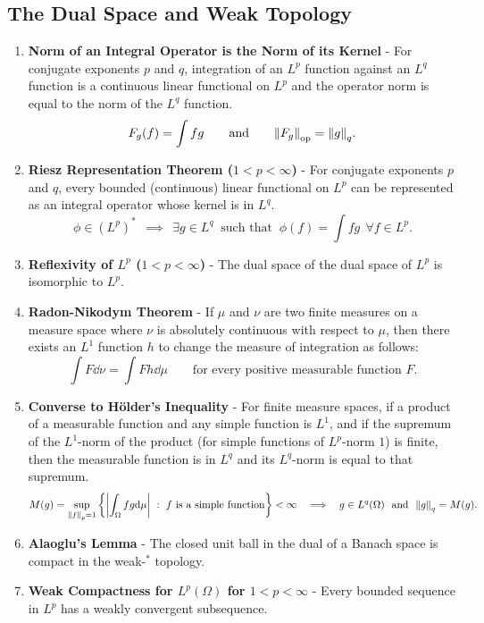 \documentclass{article}
\begin{document}
    \subsection{The Dual Space and Weak Topology}
    \begin{enumerate}
        \item
            \textbf{Norm of an Integral Operator is the Norm of its Kernel} - For conjugate exponents $p$ and $q$, integration of an $L^p$ function against an $L^q$ function is a continuous linear functional on $L^p$ and the operator norm is equal to the norm of the $L^q$ function.  $$F_g(f) = \int fg \qquad \text{and} \qquad \norm{F_g}_\text{op} = \norm{g}_q.$$
        \item
            \textbf{Riesz Representation Theorem ($1 < p < \infty$)} - For conjugate exponents $p$ and $q$, every bounded (continuous) linear functional on $L^p$ can be represented as an integral operator whose kernel is in $L^q$.  $$\phi \in (L^p)^*\ \ \implies\ \ \exists g \in L^q\ \text{ such that }\ \phi(f) = \int f g\ \ \forall f \in L^p.$$
        \item
            \textbf{Reflexivity of $L^p$ ($1 < p < \infty$)} - The dual space of the dual space of $L^p$ is isomorphic to $L^p$.
        \item
            \textbf{Radon-Nikodym Theorem} - If $\mu$ and $\nu$ are two finite measures on a measure space where $\nu$ is absolutely continuous with respect to $\mu$, then there exists an $L^1$ function $h$ to change the measure of integration as follows: $$\int F \dd\nu = \int F h \dd\mu \qquad \text{for every positive measurable function } F.$$
        \item
            \textbf{Converse to H\"{o}lder's Inequality} - For finite measure spaces, if a product of a measurable function and any simple function is $L^1$, and if the supremum of the $L^1$-norm of the product (for simple functions of $L^p$-norm $1$) is finite, then the measurable function is in $L^q$ and its $L^q$-norm is equal to that supremum.  $$M(g) = \sup_{\norm{f}_p = 1} \left\{\abs{\int_\Omega fg \dd\mu}\ :\ f \text{ is a simple function}\right\} < \infty\ \ \implies\ \ g \in L^q(\Omega)\ \ \text{and}\ \ \norm{g}_q = M(g).$$
        \item
            \textbf{Alaoglu's Lemma} - The closed unit ball in the dual of a Banach space is compact in the weak-$^*$ topology.
        \item
            \textbf{Weak Compactness for $L^p(\Omega)$ for $1 < p < \infty$} - Every bounded sequence in $L^p$ has a weakly convergent subsequence.

\end{enumerate}
\end{document}
